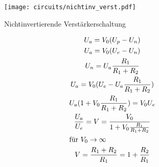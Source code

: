 \begin{figure}[H]
  \begin{center}
    \texttt{[image: circuits/nichtinv\_verst.pdf]}
    \end{center}
    \caption{Nichtinvertierende Verstärkerschaltung}
 \end{figure}

 \begin{gather*}
  U_a = V_0(U_p-U_n)\\
  U_a = V_0(U_e-U_n)\\
  U_n = U_a \frac{R_1}{R_1+R_2}\\
  U_a = V_0 (U_e - U_a \frac{R_1}{R_1 + R_2})\\
  U_a (1 + V_0 \frac{R_1}{R_1 + R_2}) = V_0 U_e\\
  \frac{U_a}{U_e} = V = \frac{V_0}{1 + V_0 \frac{R_1}{R_1+R_2}}\\
  \intertext{für $V_0 \rightarrow \infty$}
  V = \frac{R_1 + R_2}{R_1} = 1 + \frac{R_2}{R_1}
\end{gather*}

